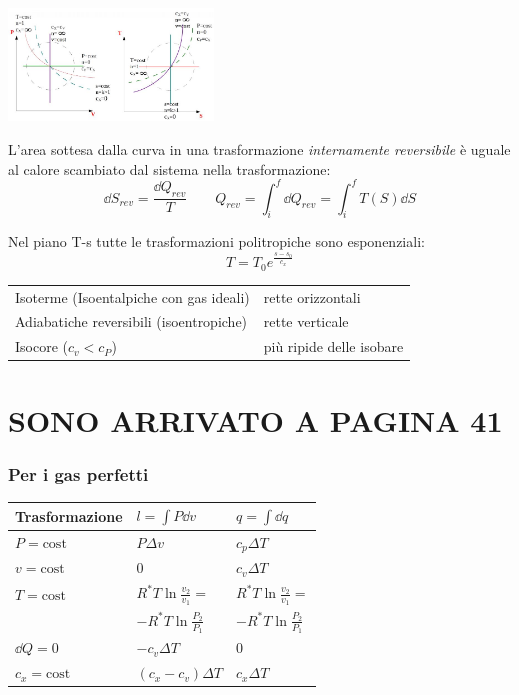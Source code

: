 \begin{center}
    \includegraphics[height=3cm]{politropiche2.JPG}
\end{center}

L'area sottesa dalla curva in una trasformazione \emph{internamente reversibile} è uguale al calore scambiato dal sistema nella trasformazione:
\[ \dd{S}_{rev} = \frac{\dd{Q}_{rev}}{T} \qquad Q_{rev} = \int_i^f \dd{Q}_{rev} = \int_i^f T(S) \dd{S} \]

Nel piano T-s tutte le trasformazioni politropiche sono esponenziali:
\[T = T_0 e ^ { \frac{s-s_0}{c_x} }\]

\begin{tabular}{ll}
    Isoterme  (Isoentalpiche con gas ideali) & rette orizzontali \\
    Adiabatiche reversibili (isoentropiche) & rette verticale \\
    Isocore ($c_v < c_P$) & più ripide delle isobare \\
\end{tabular}

\section{SONO ARRIVATO A PAGINA 41}

\subsubsection{Per i gas perfetti}
\begin{tabular}{lll}
    \toprule
    Trasformazione & $l=\int P\dd{v}$ & $q = \int \dd{q}$ \\
    \midrule
    $P = \text{cost}$ & $P\Delta v$ & $c_p\Delta T$ \\
    $v = \text{cost}$ & 0 & $c_v\Delta T$ \\
    $T = \text{cost}$ & $R^*T\ln{\frac{v_2}{v_1}} =$ & $R^*T\ln{\frac{v_2}{v_1}} =$ \\
    & $-R^*T\ln{\frac{P_2}{P_1}}$ & $-R^*T\ln{\frac{P_2}{P_1}}$ \\
    $\dd{Q}=0$ & $-c_v\Delta T$ & 0 \\
    $c_x = \text{cost}$ & $(c_x-c_v)\Delta T$ & $c_x\Delta T$ \\
    \bottomrule
\end{tabular}

